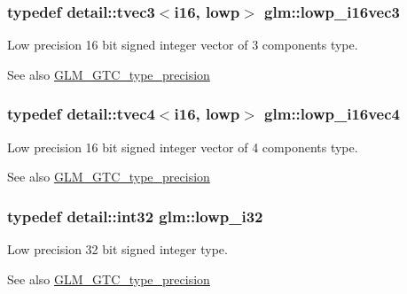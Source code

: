 \subsubsection[{\texorpdfstring{lowp\+\_\+i16vec3}{lowp_i16vec3}}]{\setlength{\rightskip}{0pt plus 5cm}typedef detail\+::tvec3$<$i16, lowp$>$ {\bf glm\+::lowp\+\_\+i16vec3}}\hypertarget{group__gtc__type__precision_ga5b71f24a26316aa21f3c58d25c8db9a8}{}\label{group__gtc__type__precision_ga5b71f24a26316aa21f3c58d25c8db9a8}
Low precision 16 bit signed integer vector of 3 components type. \begin{DoxySeeAlso}{See also}
\hyperlink{group__gtc__type__precision}{G\+L\+M\+\_\+\+G\+T\+C\+\_\+type\+\_\+precision} 
\end{DoxySeeAlso}
\subsubsection[{\texorpdfstring{lowp\+\_\+i16vec4}{lowp_i16vec4}}]{\setlength{\rightskip}{0pt plus 5cm}typedef detail\+::tvec4$<$i16, lowp$>$ {\bf glm\+::lowp\+\_\+i16vec4}}\hypertarget{group__gtc__type__precision_ga59ea63973187e1e990fb6633d1800c6d}{}\label{group__gtc__type__precision_ga59ea63973187e1e990fb6633d1800c6d}
Low precision 16 bit signed integer vector of 4 components type. \begin{DoxySeeAlso}{See also}
\hyperlink{group__gtc__type__precision}{G\+L\+M\+\_\+\+G\+T\+C\+\_\+type\+\_\+precision} 
\end{DoxySeeAlso}
\subsubsection[{\texorpdfstring{lowp\+\_\+i32}{lowp_i32}}]{\setlength{\rightskip}{0pt plus 5cm}typedef detail\+::int32 {\bf glm\+::lowp\+\_\+i32}}\hypertarget{group__gtc__type__precision_ga70fd34e8b8cffc92739161284ed77328}{}\label{group__gtc__type__precision_ga70fd34e8b8cffc92739161284ed77328}
Low precision 32 bit signed integer type. \begin{DoxySeeAlso}{See also}
\hyperlink{group__gtc__type__precision}{G\+L\+M\+\_\+\+G\+T\+C\+\_\+type\+\_\+precision} 
\end{DoxySeeAlso}
